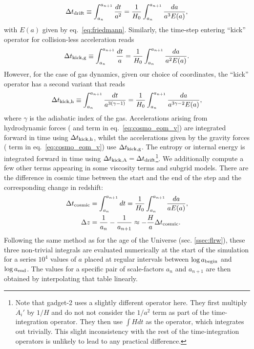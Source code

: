 \begin{equation}
  \Delta t_{\rm drift} \equiv \int_{a_n}^{a_{n+1}} \frac{dt}{a^2} = \frac{1}{H_0} \int_{a_n}^{a_{n+1}} \frac{da}{a^3E(a)},
\end{equation}
with $E(a)$ given by eq.~\ref{eq:friedmann}. Similarly, the time-step
entering ``kick'' operator for collision-less acceleration reads
\begin{equation}
  \Delta t_{\rm kick,g} \equiv \int_{a_n}^{a_{n+1}} \frac{dt}{a} = \frac{1}{H_0} \int_{a_n}^{a_{n+1}} \frac{da}{a^2E(a)}.
\end{equation}
However, for the case of gas dynamics, given our choice of
coordinates, the ``kick'' operator has a second variant that reads
\begin{equation}
  \Delta t_{\rm kick,h} \equiv \int_{a_n}^{a_{n+1}} \frac{dt}{a^{3(\gamma-1)}} = \frac{1}{H_0} \int_{a_n}^{a_{n+1}} \frac{da}{a^{3\gamma - 2}E(a)},
\end{equation}
where $\gamma$ is the adiabatic index of the gas.  Accelerations
arising from hydrodynamic forces ( and  term in
eq.~\ref{eq:cosmo_eom_v}) are integrated forward in time using $\Delta
t_{\rm kick,h}$, whilst the accelerations given by the gravity forces
( term in eq.~\ref{eq:cosmo_eom_v}) use $\Delta t_{\rm
  kick,g}$. The entropy or internal energy is integrated forward in
time using $\Delta t_{\rm kick,A} = \Delta t_{\rm
  drift}$\footnote{Note that {\sc gadget-2} uses a slightly different
  operator here. They first multiply $\dot{A}_i'$ by $1/H$ and do not
  not consider the $1/a^2$ term as part of the time-integration
  operator. They then use $\int H dt$ as the operator, which
  integrates out trivially. This slight inconsistency with the rest of
  the time-integration operators is unlikely to lead to any practical
  difference.}. We additionally compute a few other terms
appearing in some viscosity terms and subgrid models. There are the
difference in cosmic time between the start and the end of the step
and the corresponding change in redshift:
\begin{align}
  \Delta t_{\rm cosmic} &= \int_{a_n}^{a_{n+1}} dt = \frac{1}{H_0}
  \int_{a_n}^{a_{n+1}} \frac{da}{a E(a)},\\
  \Delta z &= \frac{1}{a_n} - \frac{1}{a_{n+1}} \approx -\frac{H}{a} \Delta t_{\rm cosmic}.
\end{align}
Following the same method as for the age of the Universe
(sec. \ref{ssec:flrw}), these three non-trivial integrals are
evaluated numerically at the start of the simulation for a series
$10^4$ values of $a$ placed at regular intervals between $\log a_{\rm
  begin}$ and $\log a_{\rm end}$. The values for a specific pair of
scale-factors $a_n$ and $a_{n+1}$ are then obtained by interpolating
that table linearly.


